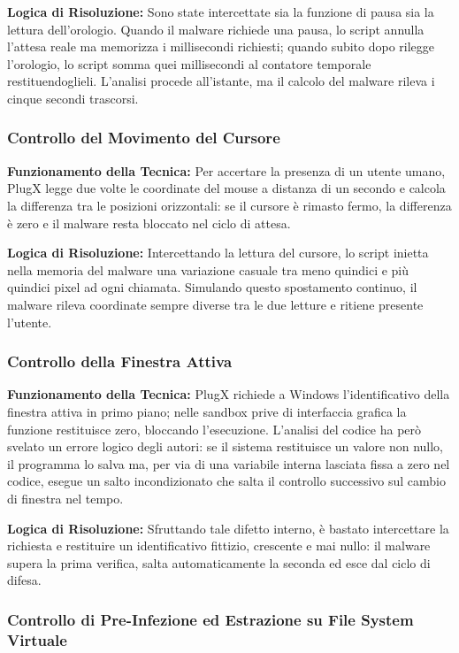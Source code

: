 \documentclass[11pt, a4paper]{article}
\begin{document}
	\textbf{Logica di Risoluzione:} Sono state intercettate sia la funzione di pausa sia la lettura dell'orologio. Quando il malware richiede una pausa, lo script annulla l'attesa reale ma memorizza i millisecondi richiesti; quando subito dopo rilegge l'orologio, lo script somma quei millisecondi al contatore temporale restituendoglieli. L'analisi procede all'istante, ma il calcolo del malware rileva i cinque secondi trascorsi.
	
	\subsubsection{Controllo del Movimento del Cursore}
	
	\textbf{Funzionamento della Tecnica:} Per accertare la presenza di un utente umano, PlugX legge due volte le coordinate del mouse a distanza di un secondo e calcola la differenza tra le posizioni orizzontali: se il cursore è rimasto fermo, la differenza è zero e il malware resta bloccato nel ciclo di attesa.
	
	\textbf{Logica di Risoluzione:} Intercettando la lettura del cursore, lo script inietta nella memoria del malware una variazione casuale tra meno quindici e più quindici pixel ad ogni chiamata. Simulando questo spostamento continuo, il malware rileva coordinate sempre diverse tra le due letture e ritiene presente l'utente.
	
	\subsubsection{Controllo della Finestra Attiva}
	
	\textbf{Funzionamento della Tecnica:} PlugX richiede a Windows l'identificativo della finestra attiva in primo piano; nelle sandbox prive di interfaccia grafica la funzione restituisce zero, bloccando l'esecuzione. L'analisi del codice ha però svelato un errore logico degli autori: se il sistema restituisce un valore non nullo, il programma lo salva ma, per via di una variabile interna lasciata fissa a zero nel codice, esegue un salto incondizionato che salta il controllo successivo sul cambio di finestra nel tempo.
	
	\textbf{Logica di Risoluzione:} Sfruttando tale difetto interno, è bastato intercettare la richiesta e restituire un identificativo fittizio, crescente e mai nullo: il malware supera la prima verifica, salta automaticamente la seconda ed esce dal ciclo di difesa.
	
	\subsubsection{Controllo di Pre-Infezione ed Estrazione su File System Virtuale}
	
\end{document}
